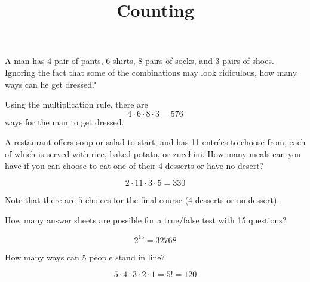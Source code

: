 \documentclass[11pt]{exam}
\title{Counting}
\begin{document}
\begin{questions}



\question A man has 4 pair of pants, 6 shirts, 8 pairs of socks, and 3 pairs of
shoes.  Ignoring the fact that some of the combinations may look ridiculous,
how many ways can he get dressed?

\begin{solution}
Using the multiplication rule, there are
\[
  4 \cdot 6 \cdot 8 \cdot 3 = 576
\]
ways for the man to get dressed.
\end{solution}



\question A restaurant offers soup or salad to start, and has 11 entr\'ees to choose
from, each of which is served with rice, baked potato, or zucchini.   How many
meals can you have if you can choose to eat one of their 4 desserts or have no
desert?

\begin{solution}
\[
  2 \cdot 11 \cdot 3 \cdot 5 = 330
\]

Note that there are $5$ choices for the final course (4 desserts or no
dessert).

\end{solution}



\question How many answer sheets are possible for a true/false test with 15
questions?

\begin{solution}
\[
  2^{15} = 32768
\]
\end{solution}






\question How many ways can 5 people stand in line?

\begin{solution}
\[
  5 \cdot 4 \cdot 3 \cdot 2 \cdot 1 = 5! = 120
\]
\end{solution}


\end{questions}
\end{document}
